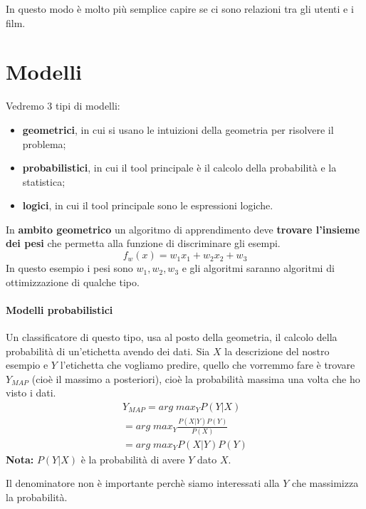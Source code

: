 In questo modo è molto più semplice capire se ci sono relazioni tra gli utenti e i film.

\newpage

\section{Modelli} Vedremo 3 tipi di modelli:
\begin{itemize}
    \item \textbf{geometrici}, in cui si usano le intuizioni della geometria per risolvere il problema;
    \item \textbf{probabilistici}, in cui il tool principale è il calcolo della probabilità e la statistica;
    \item \textbf{logici}, in cui il tool principale sono le espressioni logiche.
\end{itemize}

In \textbf{ambito geometrico} un algoritmo di apprendimento deve \textbf{trovare l'insieme dei pesi} che permetta alla funzione di discriminare gli esempi.
\begin{equation}
    f_w(x)=w_1x_1+w_2x_2+w_3
\end{equation}
In questo esempio i pesi sono $w_1, w_2, w_3$ e gli algoritmi saranno algoritmi di ottimizzazione di qualche tipo.

\paragraph{Modelli probabilistici} Un classificatore di questo tipo, usa al posto della geometria, il calcolo della probabilità di un'etichetta avendo dei dati. Sia $X$ la descrizione del nostro esempio e $Y$ l'etichetta che vogliamo predire, quello che vorremmo fare è trovare $Y_{MAP}$ (cioè il massimo a posteriori), cioè la probabilità massima una volta che ho visto i dati.
\begin{equation}
\begin{split}
    Y_{MAP} = arg\; max_Y P(Y|X) \\
            = arg\; max_Y \frac{P(X|Y)P(Y)}{P(X)} \\
            = arg\; max_Y P(X|Y)P(Y)
\end{split}
\end{equation}
\textbf{Nota:} $P(Y|X)$ è la probabilità di avere $Y$ dato $X$.

Il denominatore non è importante perchè siamo interessati alla $Y$ che massimizza la probabilità.

